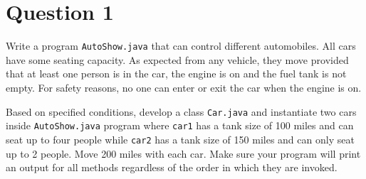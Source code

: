 \documentclass[12pt,letterpaper,twoside]{article}
\begin{document}


\section*{Question 1}

Write a program \texttt{AutoShow.java} that can control different automobiles. All cars have some seating capacity. As expected from any vehicle, they move provided that at least one person is in the car, the engine is on and the fuel tank is not empty. For safety reasons, no one can enter or exit the car when the engine is on.

Based on specified conditions, develop a class \texttt{Car.java} and instantiate two cars inside \texttt{AutoShow.java} program where \texttt{car1} has a tank size of 100 miles and can seat up to four people while \texttt{car2} has a tank size of 150 miles and can only seat up to 2 people. Move 200 miles with each car. Make sure your program will print an output for all methods regardless of the order in which they are invoked.

\end{document}
